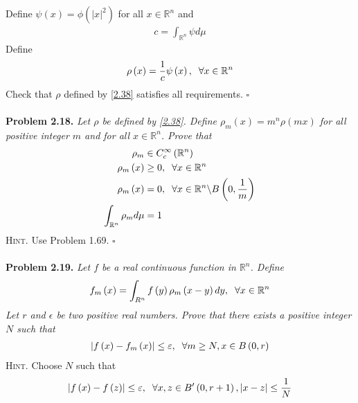 \documentclass[a4paper]{article}
\numberwithin{equation}{section}
\begin{document}
Define $\psi \left( x \right) = \phi \left( {{{\left| x \right|}^2}} \right)$ for all $x\in \mathbb{R}^n$ and
\begin{align}
c = \int_{{\mathbb{R}^n}} {\psi d\mu } 
\end{align}
Define 
\begin{align}
\label{2.38}
\rho \left( x \right) = \frac{1}{c}\psi \left( x \right),\hspace{0.2cm}\forall x \in {\mathbb{R}^n}
\end{align}
Check that $\rho$ defined by \eqref{2.38} satisfies all requirements. \hfill $\square$\\
\\
\textbf{Problem 2.18.} \textit{Let $\rho$ be defined by \eqref{2.38}. Define ${\rho _m}\left( x \right) = {m^n}\rho \left( {mx} \right)$ for all positive integer $m$ and for all $x \in \mathbb{R}^n$. Prove that}
\begin{align}
{\rho _m} &\in C_c^\infty \left( {{\mathbb{R}^n}} \right)\\
{\rho _m}\left( x \right) &\ge 0,\hspace{0.2cm}\forall x \in {\mathbb{R}^n}\\
{\rho _m}\left( x \right) &= 0,\hspace{0.2cm}\forall x \in {\mathbb{R}^n}\backslash B\left( {0,\frac{1}{m}} \right)\\
\int_{{\mathbb{R}^n}} {{\rho _m}d\mu }  &= 1
\end{align}
\textsc{Hint.} Use Problem 1.69. \hfill $\square$\\
\\
\textbf{Problem 2.19.} \textit{Let $f$ be a real continuous function in $\mathbb{R}^n$. Define}
\begin{align}
{f_m}\left( x \right) = \int_{{R^n}} {f\left( y \right){\rho _m}\left( {x - y} \right)dy} ,\hspace{0.2cm}\forall x \in {\mathbb{R}^n}
\end{align}
\textit{Let $r$ and $\epsilon$ be two positive real numbers. Prove that there exists a positive integer $N$ such that}
\begin{align}
\left| {f\left( x \right) - {f_m}\left( x \right)} \right| \le \varepsilon ,\hspace{0.2cm}\forall m \ge N,x \in B\left( {0,r} \right)
\end{align}
\textsc{Hint.} Choose $N$ such that
\begin{align}
\left| {f\left( x \right) - f\left( z \right)} \right| \le \varepsilon ,\hspace{0.2cm}\forall x,z \in B'\left( {0,r + 1} \right),\left| {x - z} \right| \le \frac{1}{N}
\end{align}
\end{document}
